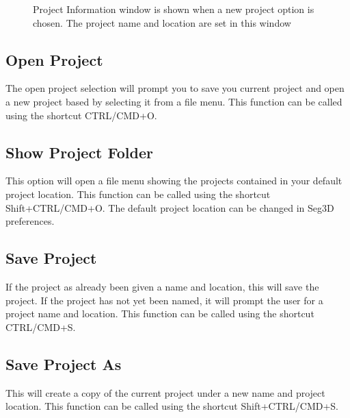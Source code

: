 \documentclass[fleqn,11pt,openany]{book}
\begin{document}
\begin{figure}[h!]
\caption{Project Information window is shown when a new project option is chosen. The project name and location are set in this window}\label{fig:newproject}
\end{figure}

\subsection{Open Project}
\label{sec:openproject}
The open project selection will prompt you to save you current project and open a new project based by selecting it from a file menu.  This function can be called using the shortcut CTRL/CMD+O.

\subsection{Show Project Folder}
This option will open a file menu showing the projects contained in your default project location.  This function can be called using the shortcut Shift+CTRL/CMD+O.  The default project location can be changed in Seg3D preferences.

\subsection{Save Project}
If the project as already been given a name and location, this will save the project.  If the project has not yet been named, it will prompt the user for a project name and location.  This function can be called using the shortcut CTRL/CMD+S.

\subsection{Save Project As}
\label{sec:saveprojectas}
This will create a copy of the current project under a new name and project location.  This function can be called using the shortcut Shift+CTRL/CMD+S.
\end{document}
